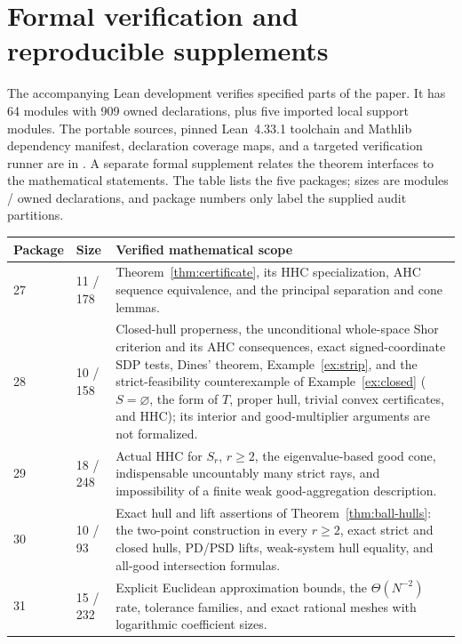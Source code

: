 \section{Formal verification and reproducible supplements}
\label{sec:formal-overview}

The accompanying Lean development verifies specified parts of the
paper. It has 64 modules with 909 owned declarations, plus five imported
local support modules. The portable sources, pinned Lean~4.33.1
toolchain and Mathlib dependency manifest, declaration coverage maps,
and a targeted verification runner are in . A
separate formal supplement relates the theorem interfaces to the
mathematical statements. The table lists the five packages; sizes are
modules / owned declarations, and package numbers only label the
supplied audit partitions.

\begin{center}
\small
\begin{tabular}{@{}p{}p{}p{}@{}}
\hline
Package & Size & Verified mathematical scope\\
\hline
27 & 11 / 178 & Theorem~\ref{thm:certificate}, its HHC specialization,
AHC sequence equivalence, and the principal separation and cone lemmas.\\[3pt]
28 & 10 / 158 & Closed-hull properness, the unconditional whole-space Shor
criterion and its AHC consequences, exact signed-coordinate SDP tests,
Dines' theorem, Example~\ref{ex:strip}, and the strict-feasibility
counterexample of Example~\ref{ex:closed} ($S=\varnothing$, the form of
$T$, proper hull, trivial convex certificates, and HHC); its interior
and good-multiplier arguments are not formalized.\\[3pt]
29 & 18 / 248 & Actual HHC for $S_r$, $r\geq2$, the eigenvalue-based good
cone, indispensable uncountably many strict rays, and impossibility of a
finite weak good-aggregation description.\\[3pt]
30 & 10 / 93 & Exact hull and lift assertions of Theorem~\ref{thm:ball-hulls}: the two-point
construction in every $r\geq2$, exact strict and closed hulls, PD/PSD lifts,
weak-system hull equality, and all-good intersection formulas.\\[3pt]
31 & 15 / 232 & Explicit Euclidean approximation bounds, the
$\Theta(N^{-2})$ rate, tolerance families, and exact rational meshes with
logarithmic coefficient sizes.\\
\hline
\end{tabular}
\end{center}

